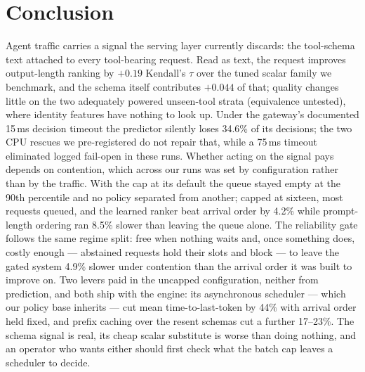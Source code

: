 \section{Conclusion}

Agent traffic carries a signal the serving layer currently discards: the
tool-schema text attached to every tool-bearing request. Read as text, the
request improves output-length ranking by $+0.19$ Kendall's $\tau$ over the
tuned scalar family we benchmark, and the schema itself contributes $+0.044$
of that; quality changes little on the two adequately powered unseen-tool
strata (equivalence untested), where identity features have nothing to look
up. Under the gateway's documented 15\,ms decision timeout the predictor
silently loses 34.6\% of its decisions; the two CPU rescues we
pre-registered do not repair that, while a 75\,ms timeout eliminated logged
fail-open in these runs. Whether acting on the signal pays depends on contention, which across our
runs was set by configuration rather than by the traffic. With the cap at its default the queue stayed empty at the 90th percentile
and no policy separated from another; capped at sixteen, most requests
queued, and the learned ranker beat arrival order by 4.2\% while
prompt-length ordering ran 8.5\% slower than leaving the queue alone. The reliability gate follows the same regime split: free when nothing
waits and, once something does, costly enough --- abstained requests hold
their slots and block --- to leave
the gated system 4.9\% slower under contention than the arrival order it was
built to improve on. Two levers paid in
the uncapped configuration, neither from prediction, and both ship with the
engine: its asynchronous scheduler --- which our policy base inherits --- cut
mean time-to-last-token by 44\% with arrival order held fixed, and prefix
caching over the resent schemas cut a further 17--23\%. The schema signal is real, its cheap scalar substitute is worse than doing
nothing, and an operator who wants either should first check what the batch
cap leaves a scheduler to decide.
